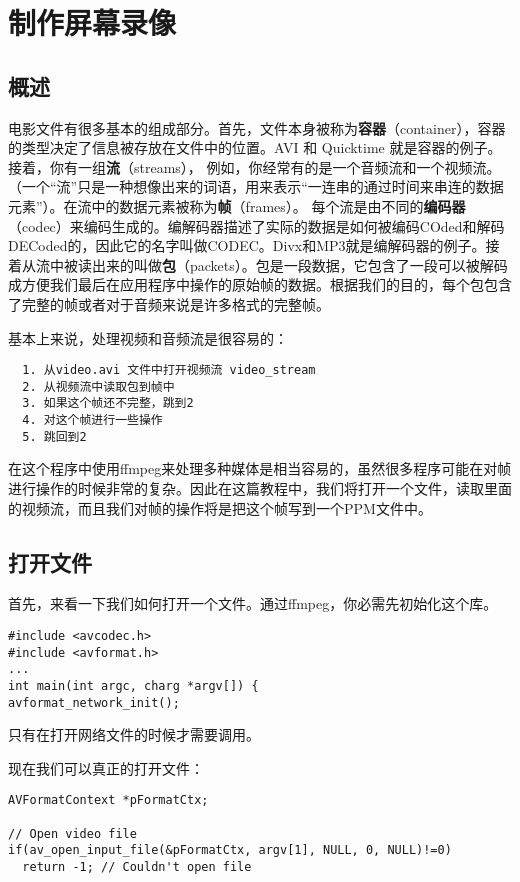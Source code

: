 ﻿\chapter{制作屏幕录像}
\label{ch1}
\section{概述}
电影文件有很多基本的组成部分。首先，文件本身被称为\textbf{容器}（container），容器的类型决定了信息被存放在文件中的位置。AVI 和 Quicktime 就是容器的例子。接着，你有一组\textbf{流}（streams）， 例如，你经常有的是一个音频流和一个视频流。（一个“流”只是一种想像出来的词语，用来表示“一连串的通过时间来串连的数据元素”）。在流中的数据元素被称为\textbf{帧}（frames）。 每个流是由不同的\textbf{编码器}（codec）来编码生成的。编解码器描述了实际的数据是如何被编码COded和解码DECoded的，因此它的名字叫做CODEC。Divx和MP3就是编解码器的例子。接着从流中被读出来的叫做\textbf{包}（packets）。包是一段数据，它包含了一段可以被解码成方便我们最后在应用程序中操作的原始帧的数据。根据我们的目的，每个包包含了完整的帧或者对于音频来说是许多格式的完整帧。

基本上来说，处理视频和音频流是很容易的：

\begin{verbatim}
  1. 从video.avi 文件中打开视频流 video_stream
  2. 从视频流中读取包到帧中
  3. 如果这个帧还不完整，跳到2
  4. 对这个帧进行一些操作
  5. 跳回到2
\end{verbatim}


在这个程序中使用ffmpeg来处理多种媒体是相当容易的，虽然很多程序可能在对帧进行操作的时候非常的复杂。因此在这篇教程中，我们将打开一个文件，读取里面的视频流，而且我们对帧的操作将是把这个帧写到一个PPM文件中。

\section{打开文件}

首先，来看一下我们如何打开一个文件。通过ffmpeg，你必需先初始化这个库。
\begin{lstlisting}
#include <avcodec.h>
#include <avformat.h>
...
int main(int argc, charg *argv[]) {
avformat_network_init();
\end{lstlisting}


只有在打开网络文件的时候才需要调用。

现在我们可以真正的打开文件：
\begin{lstlisting}
AVFormatContext *pFormatCtx;

// Open video file
if(av_open_input_file(&pFormatCtx, argv[1], NULL, 0, NULL)!=0)
  return -1; // Couldn't open file
\end{lstlisting}

